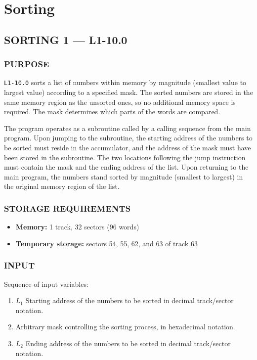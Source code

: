 \section{Sorting}
\subsection*{SORTING 1 --- L1-10.0}

\subsubsection*{PURPOSE}
\texttt{L1-10.0} sorts a list of numbers within memory by magnitude (smallest value to largest value) according to a specified mask. The sorted numbers are stored in the same memory region as the unsorted ones, so no additional memory space is required. The mask determines which parts of the words are compared.

The program operates as a subroutine called by a calling sequence from the main program. Upon jumping to the subroutine, the starting address of the numbers to be sorted must reside in the accumulator, and the address of the mask must have been stored in the subroutine. The two locations following the jump instruction must contain the mask and the ending address of the list. Upon returning to the main program, the numbers stand sorted by magnitude (smallest to largest) in the original memory region of the list.

\subsubsection*{STORAGE REQUIREMENTS}
\begin{itemize}
    \item[] \textbf{Memory:} 1 track, 32 sectors (96 words)
    \item[] \textbf{Temporary storage:} sectors 54, 55, 62, and 63 of track 63
\end{itemize}

\subsubsection*{INPUT}
Sequence of input variables:
\begin{enumerate}
    \item $L_1$ Starting address of the numbers to be sorted in decimal track/sector notation.
    \item Arbitrary mask controlling the sorting process, in hexadecimal notation.
    \item $L_2$ Ending address of the numbers to be sorted in decimal track/sector notation.
\end{enumerate}

